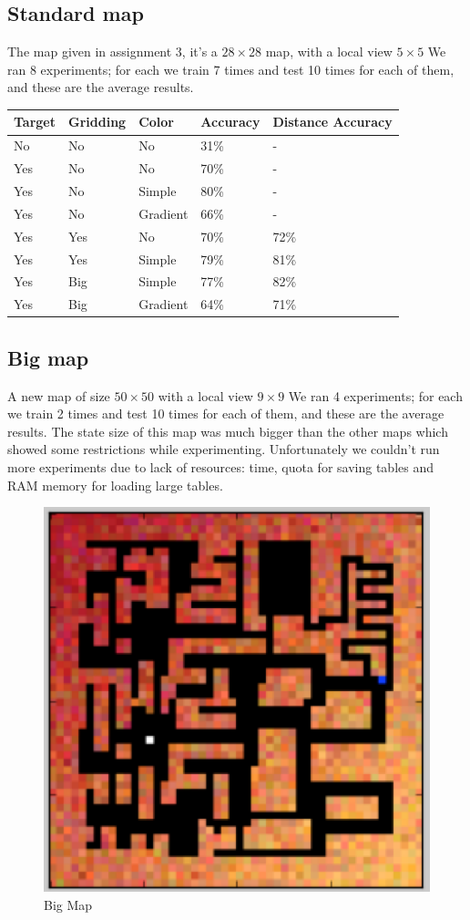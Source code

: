 \documentclass[a4paper]{article}
\begin{document}
\subsection{Standard map}
The map given in assignment 3, it's a $28 \times 28$ map, with a local view $5 \times 5$
We ran 8 experiments; for each we train 7 times and test 10 times for each of them, and these are the average results.
\begin{center}
    \begin{tabular}{| l | l | l | l | l |}
    \hline
    Target & Gridding & Color & Accuracy & Distance Accuracy \\ \hline
    No & No & No & 31\% & - \\ \hline
    Yes & No & No & 70\% & - \\ \hline
    Yes & No & Simple & 80\% & - \\ \hline
    Yes & No & Gradient & 66\% & - \\ \hline
    Yes & Yes & No & 70\% & 72\% \\ \hline
    Yes & Yes & Simple & 79\% & 81\% \\ \hline
    Yes & Big & Simple & 77\% & 82\% \\ \hline
    Yes & Big & Gradient & 64\% & 71\% \\ \hline
    \end{tabular}
\end{center}

\subsection{Big map}
A new map of size $50 \times 50$ with a local view $9 \times 9$
We ran 4 experiments; for each we train 2 times and test 10 times for each of them, and these are the average results.
The state size of this map was much bigger than the other maps which showed some restrictions while experimenting.
Unfortunately we couldn't run more experiments due to lack of resources: time, quota for saving tables and RAM memory for loading large tables.

\begin{figure}
    \centerline{\includegraphics[width=0.45\linewidth]{bigmap.png}}
    \caption{Big Map}\label{fig4}
\end{figure}
\end{document}
